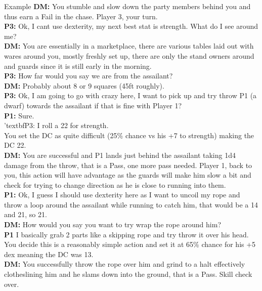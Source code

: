 \documentclass[10pt,twoside,twocolumn]{article}
\begin{document}
\begin{paperbox}{Example}
\textbf{DM:} You stumble and slow down the party members behind you and thus earn a Fail in the chase. Player 3, your turn.\\
\textbf{P3:} Ok, I cant use dexterity, my next best stat is strength. What do I see around me?\\
\textbf{DM:} You are essentially in a marketplace, there are various tables laid out with wares around you, mostly freshly set up, there are only the stand owners around and guards since it is still early in the morning.\\
\textbf{P3:} How far would you say we are from the assailant?\\
\textbf{DM:} Probably about 8 or 9 squares (45ft roughly).\\
\textbf{P3:} Ok, I am going to go with crazy here, I want to pick up and try throw P1 (a dwarf) towards the assailant if that is fine with Player 1?\\
\textbf{P1:} Sure.\\
'textbf{P3:} I roll a 22 for strength.\\

You set the DC as quite difficult (25\% chance vs his +7 to strength) making the DC 22.\\

\textbf{DM:} You are successful and P1 lands just behind the assailant taking 1d4 damage from the throw, that is a Pass, one more pass needed. Player 1, back to you, this action will have advantage as the guards will make him slow a bit and check for trying to change direction as he is close to running into them.\\
\textbf{P1:} Ok, I guess I should use dexterity here as I want to uncoil my rope and throw a loop around the assailant while running to catch him, that would be a 14 and 21, so 21.\\
\textbf{DM:} How would you say you want to try wrap the rope around him?\\
\textbf{P1} I basically grab 2 parts like a skipping rope and try throw it over his head.\\

You decide this is a reasonably simple action and set it at 65\% chance for his +5 dex meaning the DC was 13.\\

\textbf{DM:} You successfully throw the rope over him and grind to a halt effectively clotheslining him and he slams down into the ground, that is a Pass. Skill check over.\\

\end{paperbox}
\end{document}
